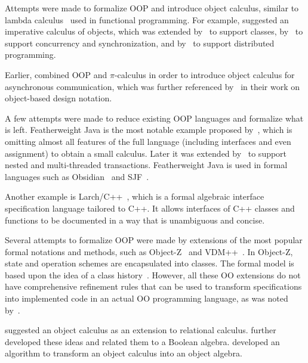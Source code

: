 
Attempts were made to formalize OOP and introduce object calculus,
similar to lambda calculus~\citep{barendregt2012} used in functional programming.
For example, \citet{abadi1995imperative} suggested an imperative calculus of objects,
which was extended by~\citet{bono1998imperative} to support classes,
by~\citet{gordon1998concurrent} to support concurrency and synchronization,
and by~\citet{jeffrey1999distributed} to support distributed programming.

Earlier, \citet{honda1991object} combined OOP and \(\pi\)-calculus in order to
introduce object calculus for asynchronous communication, which was further
referenced by~\citet{jones1993pi} in their work on object-based design notation.

A few attempts were made to reduce existing OOP languages
and formalize what is left. Featherweight Java is the most notable example
proposed by~\citet{igarashi2001featherweight}, which is
omitting almost all features of the full language (including interfaces and
even assignment) to obtain a small calculus.
Later it was extended by~\citet{jagannathan2005transactional} to support
nested and multi-threaded transactions. Featherweight Java is used in formal languages
such as Obsidian~\citep{coblenz2019} and SJF~\citep{usov2020}.

Another example is Larch/C++~\citep{cheon1994quick}, which is a formal
algebraic interface
specification language tailored to C++. It allows interfaces of C++ classes and
functions to be documented in a way that is unambiguous and concise.

Several attempts to formalize OOP were made by extensions of the most popular
formal notations and methods, such as Object-Z~\citep{duke1991object} and
VDM++~\citep{durr1992vdm}. In
Object-Z, state and operation schemes are encapsulated into classes. The formal
model is based upon the idea of a class history~\citep{duke1990towards}.
However, all these OO extensions do not have comprehensive
refinement rules that can be used to transform specifications into implemented
code in an actual OO programming language, as was noted by~\citet{paige1999object}.

\citet{bancilhon1985calculus} suggested an object calculus as an extension
to relational calculus. \citet{jankowska2003anotheroop} further developed
these ideas and related them to a Boolean algebra.
\citet{leekwakryu1996transform} developed an algorithm
to transform an object calculus into an object algebra.

